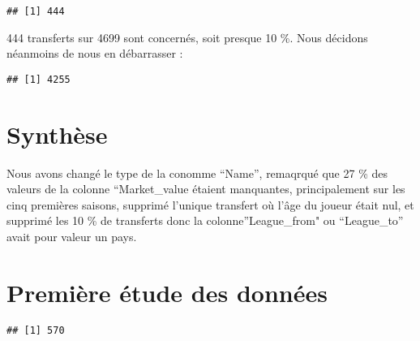 \documentclass[]{article}
\newenvironment{Shaded}{\begin{snugshade}}{\end{snugshade}}
\newcommand{\KeywordTok}[1]{\textcolor[rgb]{0.13,0.29,0.53}{\textbf{#1}}}
\newcommand{\NormalTok}[1]{#1}
\newcommand{\OperatorTok}[1]{\textcolor[rgb]{0.81,0.36,0.00}{\textbf{#1}}}
\newcommand{\StringTok}[1]{\textcolor[rgb]{0.31,0.60,0.02}{#1}}
\begin{document}
\begin{verbatim}
## [1] 444
\end{verbatim}

444 transferts sur 4699 sont concernés, soit presque 10 \%. Nous
décidons néanmoins de nous en débarrasser :

\begin{Shaded}
\end{Shaded}

\begin{verbatim}
## [1] 4255
\end{verbatim}

\hypertarget{synthese}{%
\section{Synthèse}\label{synthese}}

Nous avons changé le type de la conomme ``Name'', remaqrqué que 27 \%
des valeurs de la colonne ``Market\_value étaient manquantes,
principalement sur les cinq premières saisons, supprimé l'unique
transfert où l'âge du joueur était nul, et supprimé les 10 \% de
transferts donc la colonne''League\_from" ou ``League\_to'' avait pour
valeur un pays.

\hypertarget{premiere-etude-des-donnees}{%
\section{Première étude des données}\label{premiere-etude-des-donnees}}

\begin{Shaded}
\end{Shaded}

\begin{verbatim}
## [1] 570
\end{verbatim}

\begin{Shaded}
\end{Shaded}
\end{document}
